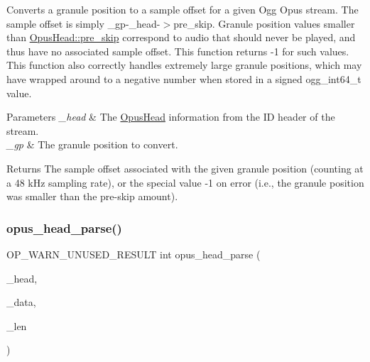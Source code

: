Converts a granule position to a sample offset for a given Ogg Opus stream. The sample offset is simply {\ttfamily \+\_\+gp-\/\+\_\+head-\/$>$pre\+\_\+skip}. Granule position values smaller than \hyperlink{struct_opus_head_ab448d3d3289d99f01dca8f19e878d57f}{Opus\+Head\+::pre\+\_\+skip} correspond to audio that should never be played, and thus have no associated sample offset. This function returns -\/1 for such values. This function also correctly handles extremely large granule positions, which may have wrapped around to a negative number when stored in a signed ogg\+\_\+int64\+\_\+t value. 
\begin{DoxyParams}{Parameters}
{\em \+\_\+head} & The \hyperlink{struct_opus_head}{Opus\+Head} information from the ID header of the stream. \\
\hline
{\em \+\_\+gp} & The granule position to convert. \\
\hline
\end{DoxyParams}
\begin{DoxyReturn}{Returns}
The sample offset associated with the given granule position (counting at a 48 k\+Hz sampling rate), or the special value -\/1 on error (i.\+e., the granule position was smaller than the pre-\/skip amount). 
\end{DoxyReturn}
\mbox{\label{group__header__info_gac3259b44ac8dfac93c7adf708de96d78}} 
\subsubsection{\texorpdfstring{opus\+\_\+head\+\_\+parse()}{opus\_head\_parse()}}
{\footnotesize\ttfamily O\+P\+\_\+\+W\+A\+R\+N\+\_\+\+U\+N\+U\+S\+E\+D\+\_\+\+R\+E\+S\+U\+LT int opus\+\_\+head\+\_\+parse (\begin{DoxyParamCaption}\item[{\hyperlink{struct_opus_head}{Opus\+Head} $\ast$}]{\+\_\+head,  }\item[{\hyperlink{zconf_8h_a2c212835823e3c54a8ab6d95c652660e}{const} unsigned char $\ast$}]{\+\_\+data,  }\item[{size\+\_\+t}]{\+\_\+len }\end{DoxyParamCaption})}

